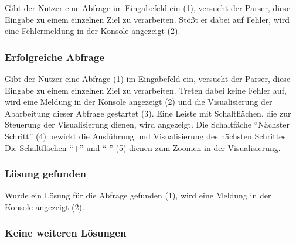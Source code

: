 \documentclass[parskip=full,11pt,twoside]{scrartcl}
\begin{document}
Gibt der Nutzer eine Abfrage im Eingabefeld ein (1), versucht der Parser, diese Eingabe zu einem einzelnen Ziel zu verarbeiten.
Stößt er dabei auf Fehler, wird eine Fehlermeldung in der Konsole angezeigt (2).

\subsubsection{Erfolgreiche Abfrage}

\begin{minipage}{\linewidth}
\end{minipage}

Gibt der Nutzer eine Abfrage (1) im Eingabefeld ein, versucht der Parser, diese Eingabe zu einem einzelnen Ziel zu verarbeiten.
Treten dabei keine Fehler auf, wird eine Meldung in der Konsole angezeigt (2) und die Visualisierung der Abarbeitung dieser Abfrage gestartet (3).
Eine Leiste mit Schaltflächen, die zur Steuerung der Visualisierung dienen, wird angezeigt.
Die Schaltfäche \enquote{Nächster Schritt} (4) bewirkt die Ausführung und Visualisierung des nächsten Schrittes.
Die Schaltflächen \enquote{+} und \enquote{-} (5) dienen zum Zoomen in der Visualisierung.

\subsubsection{Lösung gefunden}

\begin{minipage}{\linewidth}
\end{minipage}

Wurde ein Lösung für die Abfrage gefunden (1), wird eine Meldung in der Konsole angezeigt (2).

\subsubsection{Keine weiteren Lösungen}

\begin{minipage}{\linewidth}
\end{minipage}
\end{document}
